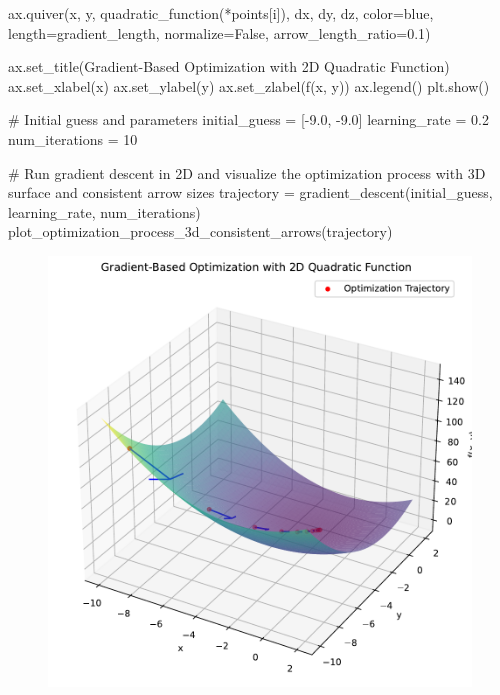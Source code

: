 \documentclass[
  letterpaper,
  DIV=11,
  numbers=noendperiod]{scrreprt}
\newenvironment{Shaded}{\begin{snugshade}}{\end{snugshade}}
\newcommand{\CommentTok}[1]{\textcolor[rgb]{0.37,0.37,0.37}{#1}}
\newcommand{\DecValTok}[1]{\textcolor[rgb]{0.68,0.00,0.00}{#1}}
\newcommand{\FloatTok}[1]{\textcolor[rgb]{0.68,0.00,0.00}{#1}}
\newcommand{\NormalTok}[1]{\textcolor[rgb]{0.00,0.23,0.31}{#1}}
\newcommand{\OperatorTok}[1]{\textcolor[rgb]{0.37,0.37,0.37}{#1}}
\newcommand{\StringTok}[1]{\textcolor[rgb]{0.13,0.47,0.30}{#1}}
\newcommand{\VariableTok}[1]{\textcolor[rgb]{0.07,0.07,0.07}{#1}}
\begin{document}
\begin{tcolorbox}
\begin{Shaded}
\begin{Highlighting}[]
\NormalTok{        ax.quiver(x, y, quadratic\_function(}\OperatorTok{*}\NormalTok{points[i]), dx, dy, dz, color}\OperatorTok{=}\StringTok{\textquotesingle{}blue\textquotesingle{}}\NormalTok{, length}\OperatorTok{=}\NormalTok{gradient\_length, normalize}\OperatorTok{=}\VariableTok{False}\NormalTok{, arrow\_length\_ratio}\OperatorTok{=}\FloatTok{0.1}\NormalTok{)}

\NormalTok{    ax.set\_title(}\StringTok{\textquotesingle{}Gradient{-}Based Optimization with 2D Quadratic Function\textquotesingle{}}\NormalTok{)}
\NormalTok{    ax.set\_xlabel(}\StringTok{\textquotesingle{}x\textquotesingle{}}\NormalTok{)}
\NormalTok{    ax.set\_ylabel(}\StringTok{\textquotesingle{}y\textquotesingle{}}\NormalTok{)}
\NormalTok{    ax.set\_zlabel(}\StringTok{\textquotesingle{}f(x, y)\textquotesingle{}}\NormalTok{)}
\NormalTok{    ax.legend()}
\NormalTok{    plt.show()}

\CommentTok{\# Initial guess and parameters}
\NormalTok{initial\_guess }\OperatorTok{=}\NormalTok{ [}\OperatorTok{{-}}\FloatTok{9.0}\NormalTok{, }\OperatorTok{{-}}\FloatTok{9.0}\NormalTok{]}
\NormalTok{learning\_rate }\OperatorTok{=} \FloatTok{0.2}
\NormalTok{num\_iterations }\OperatorTok{=} \DecValTok{10}

\CommentTok{\# Run gradient descent in 2D and visualize the optimization process with 3D surface and consistent arrow sizes}
\NormalTok{trajectory }\OperatorTok{=}\NormalTok{ gradient\_descent(initial\_guess, learning\_rate, num\_iterations)}
\NormalTok{plot\_optimization\_process\_3d\_consistent\_arrows(trajectory)}
\end{Highlighting}
\end{Shaded}

\begin{figure}[H]

{\centering \includegraphics{003_scipy_optimize_intro_files/figure-pdf/cell-8-output-1.pdf}

}
\end{figure}
\end{tcolorbox}
\end{document}

